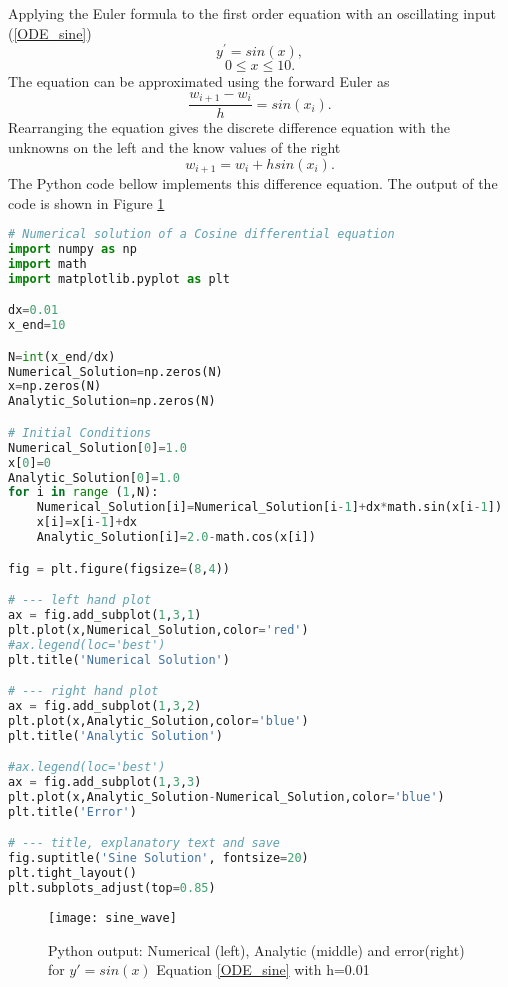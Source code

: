 \begin{example} Applying the Euler formula to the first order equation with an oscillating input
(\ref{ODE_sine})
\[ y^{'} = sin(x), \]
\[0\leq x \leq 10. \]
The equation can be approximated using the forward Euler as 
\[\frac{w_{i+1}-w_i}{h}=sin(x_i). \]
Rearranging the equation gives the discrete difference equation with the unknowns on the left and the know values of the right
\[w_{i+1}=w_i+hsin(x_i). \]
The Python code bellow implements this difference equation. The output of the code is shown in Figure \ref{Sine wave ODE}
\end{example}


\begin{lstlisting}[language=Python, caption=Python Numerical and Analytical Solution of Eqn \ref{ODE_sine} ]
# Numerical solution of a Cosine differential equation
import numpy as np
import math 
import matplotlib.pyplot as plt

dx=0.01
x_end=10

N=int(x_end/dx)
Numerical_Solution=np.zeros(N)
x=np.zeros(N)
Analytic_Solution=np.zeros(N)

# Initial Conditions
Numerical_Solution[0]=1.0
x[0]=0
Analytic_Solution[0]=1.0
for i in range (1,N):
    Numerical_Solution[i]=Numerical_Solution[i-1]+dx*math.sin(x[i-1])
    x[i]=x[i-1]+dx
    Analytic_Solution[i]=2.0-math.cos(x[i])

fig = plt.figure(figsize=(8,4))

# --- left hand plot
ax = fig.add_subplot(1,3,1)
plt.plot(x,Numerical_Solution,color='red')
#ax.legend(loc='best')
plt.title('Numerical Solution')

# --- right hand plot
ax = fig.add_subplot(1,3,2)
plt.plot(x,Analytic_Solution,color='blue')
plt.title('Analytic Solution')

#ax.legend(loc='best')
ax = fig.add_subplot(1,3,3)
plt.plot(x,Analytic_Solution-Numerical_Solution,color='blue')
plt.title('Error')

# --- title, explanatory text and save
fig.suptitle('Sine Solution', fontsize=20)
plt.tight_layout()
plt.subplots_adjust(top=0.85)
\end{lstlisting}


\begin{figure}[h]
\centering
\texttt{[image: sine\_wave]}
\caption{Python output: Numerical (left), Analytic (middle) and error(right) for $y'=sin(x)$ Equation \ref{ODE_sine} with h=0.01}
\label{Sine wave ODE}
\end{figure}

